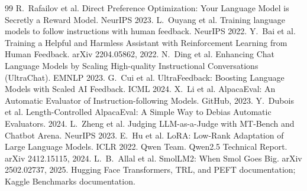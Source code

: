 \documentclass[10pt]{article}
\begin{document}
\footnotesize
\begin{thebibliography}{99}\setlength{\itemsep}{0pt}
 R.~Rafailov et al. Direct Preference Optimization: Your Language Model is Secretly a Reward Model. NeurIPS 2023.
 L.~Ouyang et al. Training language models to follow instructions with human feedback. NeurIPS 2022.
 Y.~Bai et al. Training a Helpful and Harmless Assistant with Reinforcement Learning from Human Feedback. arXiv 2204.05862, 2022.
 N.~Ding et al. Enhancing Chat Language Models by Scaling High-quality Instructional Conversations (UltraChat). EMNLP 2023.
 G.~Cui et al. UltraFeedback: Boosting Language Models with Scaled AI Feedback. ICML 2024.
 X.~Li et al. AlpacaEval: An Automatic Evaluator of Instruction-following Models. GitHub, 2023.
 Y.~Dubois et al. Length-Controlled AlpacaEval: A Simple Way to Debias Automatic Evaluators. 2024.
 L.~Zheng et al. Judging LLM-as-a-Judge with MT-Bench and Chatbot Arena. NeurIPS 2023.
 E.~Hu et al. LoRA: Low-Rank Adaptation of Large Language Models. ICLR 2022.
 Qwen Team. Qwen2.5 Technical Report. arXiv 2412.15115, 2024.
 L.~B.~Allal et al. SmolLM2: When Smol Goes Big. arXiv 2502.02737, 2025.
 Hugging Face Transformers, TRL, and PEFT documentation; Kaggle Benchmarks documentation.
\end{thebibliography}
\end{document}
